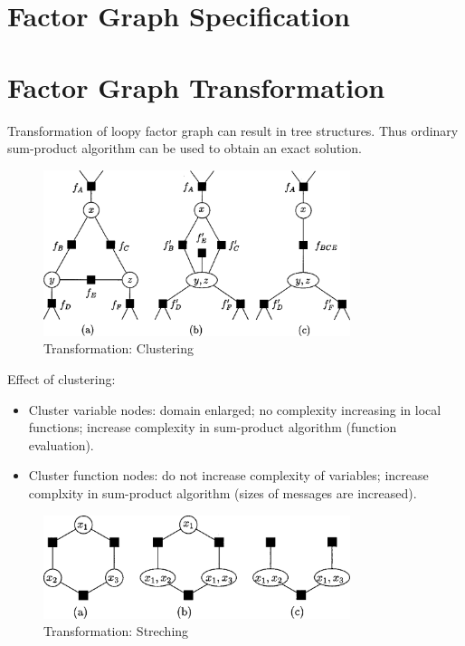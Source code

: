 \documentclass[11pt,a4paper]{article}
\begin{document}
\section{Factor Graph Specification}


\section{Factor Graph Transformation}

Transformation of loopy factor graph can result in 
tree structures. Thus ordinary sum-product algorithm 
can be used to obtain an exact solution. 

\begin{figure}[htb]
\centering
	\includegraphics[width=0.8\textwidth]{fig/kschischang2001-clutering.png}
	\caption{Transformation: Clustering}
\end{figure}	

Effect of clustering:
\begin{itemize}
	\item Cluster variable nodes: domain enlarged; no complexity increasing
	in local functions; increase complexity in sum-product algorithm
	(function evaluation). 
	\item Cluster function nodes: do not increase complexity of variables;
	increase complxity in sum-product algorithm
	(sizes of messages are increased). 
\end{itemize}

\begin{figure}[htb]
\centering
	\includegraphics[width=0.8\textwidth]{fig/kschischang2001-streching.png}
	\caption{Transformation: Streching}
\end{figure}
\end{document}
